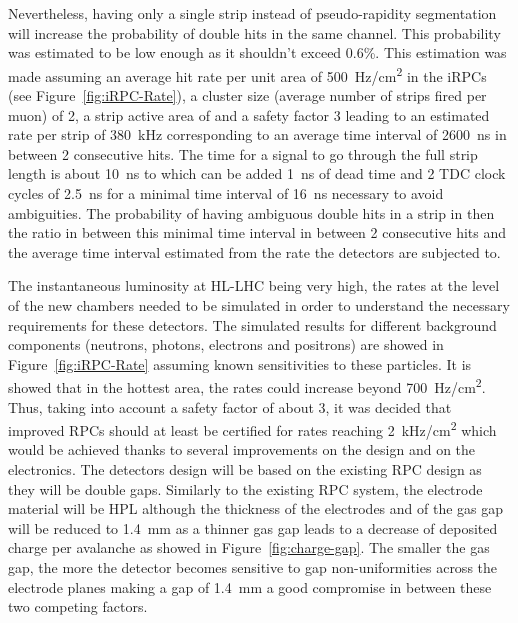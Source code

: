 	Nevertheless, having only a single strip instead of pseudo-rapidity segmentation will increase the probability of double hits in the same channel. This probability was estimated to be low enough as it shouldn't exceed 0.6\%. This estimation was made assuming an average hit rate per unit area of \SI{500}{Hz/cm^2} in the iRPCs (see Figure~\ref{fig:iRPC-Rate}), a cluster size (average number of strips fired per muon) of 2, a strip active area of  and a safety factor 3 leading to an estimated rate per strip of \SI{380}{kHz} corresponding to an average time interval of \SI{2600}{ns} in between 2 consecutive hits. The time for a signal to go through the full strip length is about \SI{10}{ns} to which can be added \SI{1}{ns} of dead time and 2 TDC clock cycles of \SI{2.5}{ns} for a minimal time interval of \SI{16}{ns} necessary to avoid ambiguities. The probability of having ambiguous double hits in a strip in then the ratio in between this minimal time interval in between 2 consecutive hits and the average time interval estimated from the rate the detectors are subjected to.
	
	The instantaneous luminosity at HL-LHC being very high, the rates at the level of the new chambers needed to be simulated in order to understand the necessary requirements for these detectors. The simulated results for different background components (neutrons, photons, electrons and positrons) are showed in Figure~\ref{fig:iRPC-Rate} assuming known sensitivities to these particles. It is showed that in the hottest area, the rates could increase beyond \SI{700}{Hz/cm^2}. Thus, taking into account a safety factor of about 3, it was decided that improved RPCs should at least be certified for rates reaching \SI{2}{kHz/cm^2} which would be achieved thanks to several improvements on the design and on the electronics. The detectors design will be based on the existing RPC design as they will be double gaps. Similarly to the existing RPC system, the electrode material will be HPL although the thickness of the electrodes and of the gas gap will be reduced to \SI{1.4}{mm} as a thinner gas gap leads to a decrease of deposited charge per avalanche as showed in Figure~\ref{fig:charge-gap}. The smaller the gas gap, the more the detector becomes sensitive to gap non-uniformities across the electrode planes making a gap of \SI{1.4}{mm} a good compromise in between these two competing factors.


